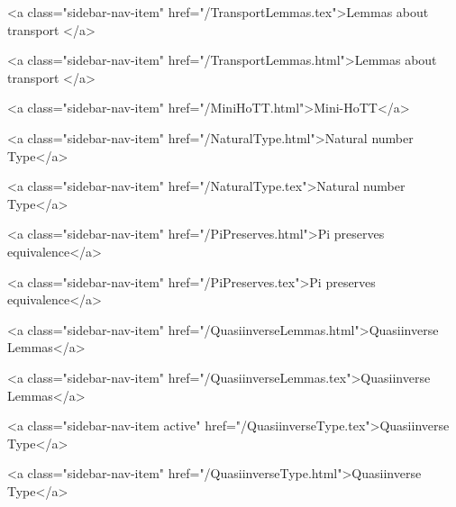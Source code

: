       
    
      
        
          <a class="sidebar-nav-item" href="/TransportLemmas.tex">Lemmas about transport </a>
        
      
    
      
        
          <a class="sidebar-nav-item" href="/TransportLemmas.html">Lemmas about transport </a>
        
      
    
      
        
          <a class="sidebar-nav-item" href="/MiniHoTT.html">Mini-HoTT</a>
        
      
    
      
        
          <a class="sidebar-nav-item" href="/NaturalType.html">Natural number Type</a>
        
      
    
      
        
          <a class="sidebar-nav-item" href="/NaturalType.tex">Natural number Type</a>
        
      
    
      
        
          <a class="sidebar-nav-item" href="/PiPreserves.html">Pi preserves equivalence</a>
        
      
    
      
        
          <a class="sidebar-nav-item" href="/PiPreserves.tex">Pi preserves equivalence</a>
        
      
    
      
        
          <a class="sidebar-nav-item" href="/QuasiinverseLemmas.html">Quasiinverse Lemmas</a>
        
      
    
      
        
          <a class="sidebar-nav-item" href="/QuasiinverseLemmas.tex">Quasiinverse Lemmas</a>
        
      
    
      
        
          <a class="sidebar-nav-item active" href="/QuasiinverseType.tex">Quasiinverse Type</a>
        
      
    
      
        
          <a class="sidebar-nav-item" href="/QuasiinverseType.html">Quasiinverse Type</a>
        
